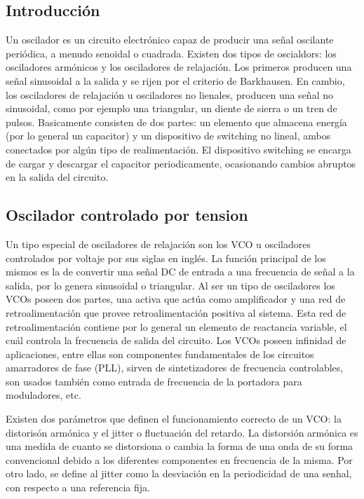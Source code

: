 


\subsection{Introducción}

Un oscilador es un circuito electrónico capaz de producir una señal oscilante periódica, a menudo senoidal o cuadrada. Existen dos tipos de oscialdors: los osciladores armónicos y los osciladores de relajación. Los primeros producen una señal sinusoidal a la salida y se rijen por el criterio de Barkhausen. En cambio, los osciladores de relajación u osciladores no lienales, producen una señal no sinusoidal, como por ejemplo una triangular, un diente de sierra o un tren de pulsos. Basicamente consisten de dos partes: un elemento que almacena energía (por lo general un capacitor) y un dispositivo de switching no lineal, ambos conectados por algún tipo de realimentación. El dispositivo switching se encarga de cargar y descargar el capacitor periodicamente, ocasionando cambios abruptos en la salida del circuito. 


\subsection{Oscilador controlado por tension}

Un tipo especial de osciladores de relajación son los VCO u osciladores controlados por voltaje por sus siglas en inglés. La función principal de los mismos es la de convertir una señal DC de entrada a una frecuencia de señal a la salida, por lo genera sinusoidal o triangular. Al ser un tipo de osciladores los VCOs poseen dos partes, una activa que actúa como amplificador y una red de retroalimentación que provee retroalimentación positiva al sistema. Esta red de retroalimentación contiene por lo general un elemento de reactancia variable, el cuál controla la frecuencia de salida del circuito. 
Los VCOs poseen infinidad de aplicaciones, entre ellas son componentes fundamentales de los circuitos amarradores de fase (PLL), sirven de sintetizadores de frecuencia controlables, son usados también como entrada de frecuencia de la portadora para moduladores, etc.


Existen dos par\'ametros que definen el funcionamiento correcto de un VCO: la distoris\'on arm\'onica y el jitter o fluctuaci\'on del retardo. La distorsi\'on arm\'onica es una medida de cuanto se distorsiona o cambia la forma de una onda de su forma convencional debido a los diferentes componentes en frecuencia de la misma. Por otro lado, se define al jitter como la desviaci\'on en la periodicidad de una senhal, con respecto a una referencia fija. 


